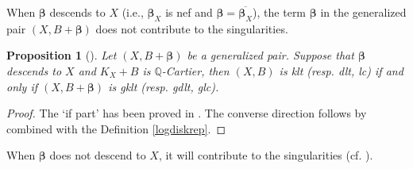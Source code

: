 \documentclass[12pt]{amsart}
\numberwithin{equation}{section}
\newtheorem{proposition}[theorem]{Proposition}
\theoremstyle{definition}
\newtheorem{example}  [theorem]     {Example}
\theoremstyle{plain}
\newtheorem*{thm A*}{Theorem A}
\newtheorem*{thm B*}{Theorem B}
\newtheorem*{thm C*}{Theorem C}
\newtheorem*{thm D*}{Theorem D}
\theoremstyle{definition}
\renewcommand{\1}{\mathds{1}}
\newcommand{\bbeta}{\boldsymbol{\beta}}
\renewcommand{\>}{\rightarrow}
\begin{document}
When ${\boldsymbol{\beta}}$ descends to $X$ (i.e., $\boldsymbol{\beta}_X$ is nef and $\bbeta =\overline {\boldsymbol{\beta}_X} $), the term $ { \boldsymbol{\beta}}$ in the generalized pair $(X,B + \boldsymbol{\beta})$ does not contribute to the singularities. 
\begin{proposition}[{\cite[Lemma 2.13]{DHY23}}]
Let $(X,B+  { \boldsymbol{\beta}})$ be a generalized pair. Suppose that $ { \boldsymbol{\beta}}$ descends to $X$ and $K_X+B$ is $\mathbb{Q}$-Cartier, then $(X,B)$ is klt (resp. dlt, lc) if and only if $(X,B+ { \boldsymbol{\beta}})$ is gklt (resp. gdlt, glc).
\end{proposition}
\begin{proof}
The `if part' has been proved in \cite[Lemma 2.13]{DHY23}. The converse direction follows by 
\cite[Remark 2.6.(a)]{DHY23} combined with the Definition \ref{logdiskrep}.
\end{proof}

When $ { \boldsymbol{\beta}}$ does not descend to $X$, it will contribute to the singularities (cf. \cite[Remark 4.2]{BZ16}).


\end{document}
